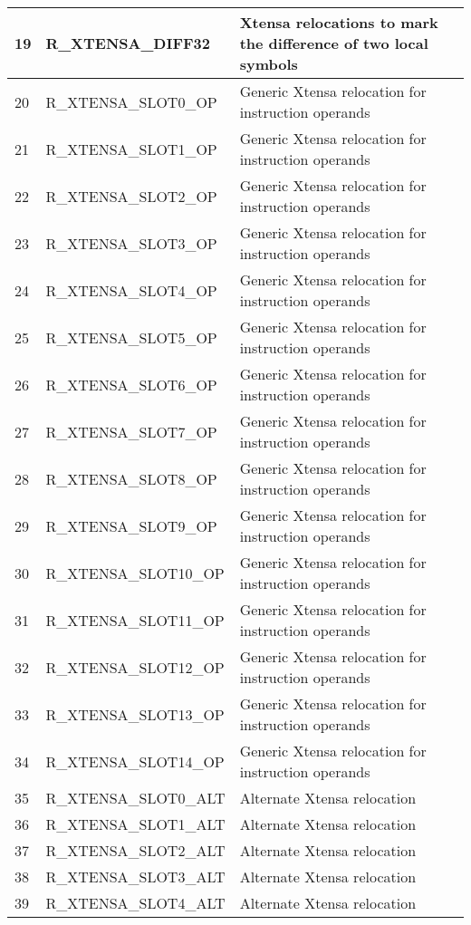 \begin{longtable}{|p{1cm}|p{6cm}|p{10cm}|}
	19 & R\_XTENSA\_DIFF32 & Xtensa relocations to mark the difference of two local symbols \\ \hline
	20 & R\_XTENSA\_SLOT0\_OP & Generic Xtensa relocation for instruction operands\\ \hline
	21 & R\_XTENSA\_SLOT1\_OP & Generic Xtensa relocation for instruction operands\\ \hline
	22 & R\_XTENSA\_SLOT2\_OP & Generic Xtensa relocation for instruction operands\\ \hline
	23 & R\_XTENSA\_SLOT3\_OP & Generic Xtensa relocation for instruction operands\\ \hline
	24 & R\_XTENSA\_SLOT4\_OP & Generic Xtensa relocation for instruction operands\\ \hline
	25 & R\_XTENSA\_SLOT5\_OP & Generic Xtensa relocation for instruction operands\\ \hline
	26 & R\_XTENSA\_SLOT6\_OP & Generic Xtensa relocation for instruction operands\\ \hline
	27 & R\_XTENSA\_SLOT7\_OP & Generic Xtensa relocation for instruction operands\\ \hline
	28 & R\_XTENSA\_SLOT8\_OP & Generic Xtensa relocation for instruction operands\\ \hline
	29 & R\_XTENSA\_SLOT9\_OP & Generic Xtensa relocation for instruction operands\\ \hline
	30 & R\_XTENSA\_SLOT10\_OP & Generic Xtensa relocation for instruction operands\\ \hline
	31 & R\_XTENSA\_SLOT11\_OP & Generic Xtensa relocation for instruction operands\\ \hline
	32 & R\_XTENSA\_SLOT12\_OP & Generic Xtensa relocation for instruction operands\\ \hline
	33 & R\_XTENSA\_SLOT13\_OP & Generic Xtensa relocation for instruction operands\\ \hline
	34 & R\_XTENSA\_SLOT14\_OP & Generic Xtensa relocation for instruction operands\\ \hline
	35 & R\_XTENSA\_SLOT0\_ALT & Alternate Xtensa relocation \\ \hline
	36 & R\_XTENSA\_SLOT1\_ALT & Alternate Xtensa relocation \\ \hline
	37 & R\_XTENSA\_SLOT2\_ALT & Alternate Xtensa relocation \\ \hline
	38 & R\_XTENSA\_SLOT3\_ALT & Alternate Xtensa relocation \\ \hline
	39 & R\_XTENSA\_SLOT4\_ALT & Alternate Xtensa relocation \\ \hline

\end{longtable}
